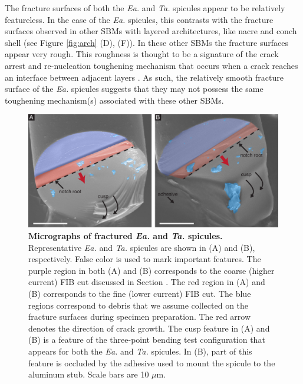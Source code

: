 \documentclass[12pt,onecolumn]{article}
\makeatletter
\DeclareRobustCommand*{\nameref}[1]{%
      \emph{\myorg@nameref{#1}}%
    }%
\newcommand{\TA}{\textit{Ta.\@}\xspace}
\newcommand{\EA}{\textit{Ea.\@}\xspace}
\makeatother
\begin{document}
 The fracture surfaces of both the \EA and \TA spicules appear to be relatively featureless. In the case of the \EA spicules, this contrasts with the fracture surfaces observed in other SBMs with layered architectures, like nacre and conch shell (see Figure \ref{fig:arch} (D), (F)). In these other SBMs the fracture surfaces appear very rough. This roughness is thought to be a signature of the crack arrest and re-nucleation toughening mechanism that occurs when a crack reaches an interface between adjacent layers \cite{karambelas2013strombus, koester2008true,liu2000bending,barthelat2009review}. 
 As such, the relatively smooth fracture surface of the \EA spicules suggests that they may not possess the same toughening mechanism(s) associated with these other SBMs.
%
\begin{figure}[hb!]
			\centering
			\includegraphics[width=\textwidth]{../Figures/FigureFract/Figure4_V5.pdf}
			\caption{\textbf{Micrographs of fractured \EA and \TA spicules.} Representative \EA and \TA spicules are shown in (A) and (B), respectively. False color is used to mark important features. The purple region in both (A) and (B) corresponds to the coarse (higher current) FIB cut discussed in Section \nameref{sec:notchconfig}. The red region in (A) and (B) corresponds to the fine (lower current) FIB cut. The blue regions correspond to debris that we assume collected on the fracture surfaces during specimen preparation. The red arrow denotes the direction of crack growth. The cusp feature in (A) and (B) is a feature of the three-point bending test configuration that appears for both the \EA and \TA spicules. In (B), part of this feature is occluded by the adhesive used to mount the spicule to the aluminum stub. Scale bars are 10 $\mu$m.}
			\label{fig:fract}
			\end{figure}
\end{document}
